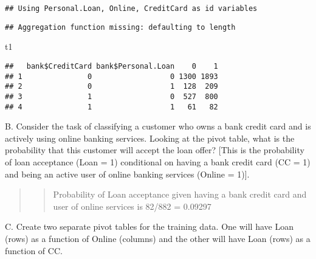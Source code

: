\documentclass[
]{article}
\newenvironment{Shaded}{\begin{snugshade}}{\end{snugshade}}
\newcommand{\FunctionTok}[1]{\textcolor[rgb]{0.00,0.00,0.00}{#1}}
\newcommand{\NormalTok}[1]{#1}
\newcommand{\OtherTok}[1]{\textcolor[rgb]{0.56,0.35,0.01}{#1}}
\newcommand{\SpecialCharTok}[1]{\textcolor[rgb]{0.00,0.00,0.00}{#1}}
\begin{document}
\begin{Shaded}
\end{Shaded}

\begin{verbatim}
## Using Personal.Loan, Online, CreditCard as id variables
\end{verbatim}

\begin{verbatim}
## Aggregation function missing: defaulting to length
\end{verbatim}

\begin{Shaded}
\begin{Highlighting}[]
\NormalTok{t1}
\end{Highlighting}
\end{Shaded}

\begin{verbatim}
##   bank$CreditCard bank$Personal.Loan    0    1
## 1               0                  0 1300 1893
## 2               0                  1  128  209
## 3               1                  0  527  800
## 4               1                  1   61   82
\end{verbatim}

B. Consider the task of classifying a customer who owns a bank credit
card and is actively using online banking services. Looking at the pivot
table, what is the probability that this customer will accept the loan
offer? {[}This is the probability of loan acceptance (Loan = 1)
conditional on having a bank credit card (CC = 1) and being an active
user of online banking services (Online = 1){]}.

\begin{quote}
\begin{quote}
Probability of Loan acceptance given having a bank credit card and user
of online services is 82/882 = 0.09297
\end{quote}
\end{quote}

C. Create two separate pivot tables for the training data. One will have
Loan (rows) as a function of Online (columns) and the other will have
Loan (rows) as a function of CC.
\end{document}
